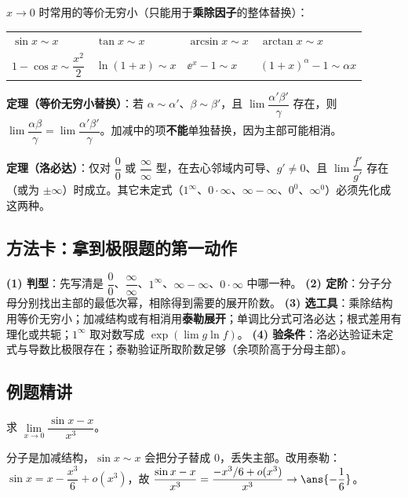 \documentclass[11pt,a4paper]{ctexart}
\begin{document}
\noindent $x\to0$ 时常用的等价无穷小（只能用于\textbf{乘除因子}的整体替换）：

\begin{center}
\begin{tabular}{llll}
\toprule
$\sin x\sim x$ & $\tan x\sim x$ & $\arcsin x\sim x$ & $\arctan x\sim x$ \\
$1-\cos x\sim \dfrac{x^2}{2}$ & $\ln(1+x)\sim x$ & $\ee^x-1\sim x$ & $(1+x)^\alpha-1\sim \alpha x$ \\
\bottomrule
\end{tabular}
\end{center}

\noindent\textbf{定理（等价无穷小替换）}：若 $\alpha\sim\alpha'$、$\beta\sim\beta'$，且 $\lim\dfrac{\alpha'\beta'}{\gamma}$ 存在，则 $\lim\dfrac{\alpha\beta}{\gamma}=\lim\dfrac{\alpha'\beta'}{\gamma}$。加减中的项\textbf{不能}单独替换，因为主部可能相消。

\noindent\textbf{定理（洛必达）}：仅对 $\dfrac00$ 或 $\dfrac{\infty}{\infty}$ 型，在去心邻域内可导、$g'\ne0$、且 $\lim\dfrac{f'}{g'}$ 存在（或为 $\pm\infty$）时成立。其它未定式（$1^\infty$、$0\cdot\infty$、$\infty-\infty$、$0^0$、$\infty^0$）必须先化成这两种。

\subsection{方法卡：拿到极限题的第一动作}

\begin{keypoint}[四步定工具]
\textbf{(1) 判型}：先写清是 $\dfrac00$、$\dfrac{\infty}{\infty}$、$1^\infty$、$\infty-\infty$、$0\cdot\infty$ 中哪一种。
\textbf{(2) 定阶}：分子分母分别找出主部的最低次幂，相除得到需要的展开阶数。
\textbf{(3) 选工具}：乘除结构用等价无穷小；加减结构或有相消用\textbf{泰勒展开}；单调比分式可洛必达；根式差用有理化或共轭；$1^\infty$ 取对数写成 $\exp(\lim g\ln f)$。
\textbf{(4) 验条件}：洛必达验证未定式与导数比极限存在；泰勒验证所取阶数足够（余项阶高于分母主部）。
\end{keypoint}

\subsection{例题精讲}

\begin{exa}
求 $\lim\limits_{x\to0}\dfrac{\sin x-x}{x^3}$。
\end{exa}
\begin{solution}
分子是加减结构，$\sin x\sim x$ 会把分子替成 $0$，丢失主部。改用泰勒：$\sin x=x-\dfrac{x^3}{6}+o(x^3)$，故
$\dfrac{\sin x-x}{x^3}=\dfrac{-x^3/6+o(x^3)}{x^3}\to\ans{-\dfrac16}$。
\end{solution}
\end{document}
